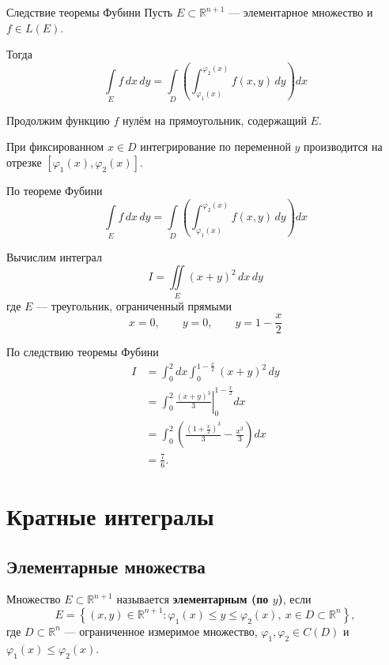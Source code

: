 \documentclass[12pt,a4paper]{article}
\begin{document}
\begin{theorem}{Следствие теоремы Фубини}
    Пусть $E\subset\mathbb R^{n+1}$ --- элементарное
    множество и $f\in L(E)$.

    Тогда
    \[
        \int\limits_E f\,dx\,dy
        =
        \int\limits_D
        \left(
        \int_{\varphi_1(x)}^{\varphi_2(x)}
        f(x,y)\,dy
        \right)dx
    \]
\end{theorem}

\begin{proofbox}{}
    Продолжим функцию $f$ нулём на прямоугольник,
    содержащий $E$.

    При фиксированном $x\in D$ интегрирование
    по переменной $y$ производится на отрезке
    $[\varphi_1(x),\varphi_2(x)]$.

    По теореме Фубини
    \[
        \int\limits_E f\,dx\,dy
        =
        \int\limits_D
        \left(
        \int_{\varphi_1(x)}^{\varphi_2(x)}
        f(x,y)\,dy
        \right)dx
    \]
\end{proofbox}

\begin{example}
    Вычислим интеграл
    \[
        I=\iint\limits_E(x+y)^2\,dx\,dy
    \]
    где $E$ --- треугольник, ограниченный прямыми
    \[
        x=0,\qquad y=0,\qquad y=1-\frac{x}{2}
    \]

    По следствию теоремы Фубини
    \begin{align*}
        I
        &=\int_0^2dx
        \int_0^{1-\frac{x}{2}}(x+y)^2\,dy\\
        &=\int_0^2
        \left.
        \frac{(x+y)^3}{3}
        \right|_0^{1-\frac{x}{2}}dx\\
        &=\int_0^2
        \left(
        \frac{(1+\frac{x}{2})^3}{3}
        -\frac{x^3}{3}
        \right)dx\\
        &=\frac76.
    \end{align*}
\end{example}

\newpage

\section{Кратные интегралы}

\subsection{Элементарные множества}

\begin{definition}
Множество $E \subset \mathbb{R}^{n+1}$ называется \textbf{элементарным (по $y$)}, если
\[
E = \left\{(x,y)\in\mathbb{R}^{n+1}:
\varphi_1(x)\leq y\leq\varphi_2(x),\
x\in D\subset\mathbb{R}^n\right\},
\]
где $D\subset\mathbb{R}^n$ — ограниченное измеримое множество,
$\varphi_1,\varphi_2\in C(D)$ и
$\varphi_1(x)\leq\varphi_2(x)$.
\end{definition}
\end{document}
